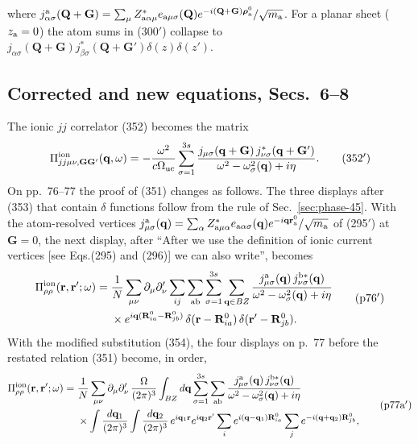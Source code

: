 \documentclass[11pt]{article}
\begin{document}
where $j^{\rm a}_{\alpha\sigma}(\mathbf Q+\mathbf G)=\sum_\mu Z^*_{{\rm a}\alpha\mu}e_{{\rm a}\mu\sigma}(\mathbf Q)
e^{-i(\mathbf Q+\mathbf G)\bm{\rho}^0_{\rm a}}/\sqrt{m_{\rm a}}$. For a planar sheet ($z_{\rm a}=0$) the atom
sums in (300$'$) collapse to $j_{\alpha\sigma}(\mathbf Q+\mathbf G)j^*_{\beta\sigma}(\mathbf Q+\mathbf G')
\delta(z)\delta(z')$.

\subsection{Corrected and new equations, Secs.~6--8}\label{sec:phase-678}
The ionic $jj$ correlator (352) becomes the matrix
\begin{equation*}
\Pi^{\rm ion}_{jj\mu\nu,\mathbf G\mathbf G'}(\mathbf q,\omega)=-\frac{\omega^2}{c\Omega_{\rm uc}}
\sum_{\sigma=1}^{3s}\frac{j_{\mu\sigma}(\mathbf q+\mathbf G)\,j^*_{\nu\sigma}(\mathbf q+\mathbf G')}
{\omega^2-\omega^2_\sigma(\mathbf q)+i\eta}.\tag{352$'$}
\end{equation*}
On pp.~76--77 the proof of (351) changes as follows. The three displays after (353) that contain
$\delta$ functions follow from the rule of Sec.~\ref{sec:phase-45}. With the atom-resolved vertices
$j^{\rm a}_{\mu\sigma}(\mathbf q)=\sum_\alpha Z^*_{{\rm a}\mu\alpha}e_{{\rm a}\alpha\sigma}(\mathbf q)
e^{-i\mathbf q\mathbf r^0_{\rm a}}/\sqrt{m_{\rm a}}$ of (295$'$) at $\mathbf G=0$, the next display, after
``After we use the definition of ionic current vertices [see Eqs.(295) and (296)] we can also write'',
becomes
\begin{equation*}
\begin{split}
\Pi^{\rm ion}_{\rho\rho}(\mathbf r,\mathbf r';\omega)={}&\frac1N\sum_{\mu\nu}\partial_\mu\partial'_\nu
\sum_{ij}\sum_{\rm ab}\sum_{\sigma=1}^{3s}\sum_{\mathbf q\in BZ}
\frac{j^{\rm a}_{\mu\sigma}(\mathbf q)\,j^{{\rm b}*}_{\nu\sigma}(\mathbf q)}{\omega^2-\omega^2_\sigma(\mathbf q)+i\eta}\\
&\times e^{i\mathbf q(\mathbf R^0_{ia}-\mathbf R^0_{jb})}\,\delta(\mathbf r-\mathbf R^0_{ia})\,
\delta(\mathbf r'-\mathbf R^0_{jb}).
\end{split}
\tag{p76$'$}
\end{equation*}
With the modified substitution (354), the four displays on p.~77 before the restated relation (351)
become, in order,
\begin{equation*}
\begin{split}
\Pi^{\rm ion}_{\rho\rho}(\mathbf r,\mathbf r';\omega)={}&\frac1N\sum_{\mu\nu}\partial_\mu\partial'_\nu\,
\frac{\Omega}{(2\pi)^3}\int_{BZ}d\mathbf q\sum_{\sigma=1}^{3s}\sum_{\rm ab}
\frac{j^{\rm a}_{\mu\sigma}(\mathbf q)\,j^{{\rm b}*}_{\nu\sigma}(\mathbf q)}{\omega^2-\omega^2_\sigma(\mathbf q)+i\eta}\\
&\times\int\frac{d\mathbf q_1}{(2\pi)^3}\int\frac{d\mathbf q_2}{(2\pi)^3}\,
e^{i\mathbf q_1\mathbf r}e^{i\mathbf q_2\mathbf r'}\sum_ie^{i(\mathbf q-\mathbf q_1)\mathbf R^0_{ia}}
\sum_je^{-i(\mathbf q+\mathbf q_2)\mathbf R^0_{jb}},
\end{split}
\tag{p77a$'$}
\end{equation*}
\end{document}
